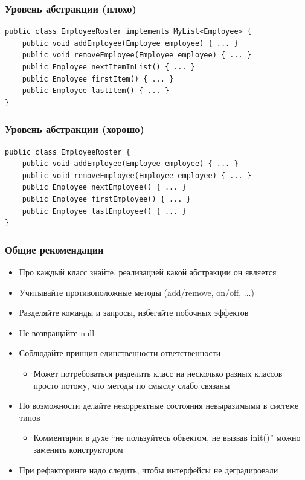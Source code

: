 \documentclass[xetex,mathserif,serif]{beamer}
\begin{document}
	\begin{frame}[fragile]
		\frametitle{Уровень абстракции (плохо)}
		\begin{verbatim}
public class EmployeeRoster implements MyList<Employee> {
    public void addEmployee(Employee employee) { ... }
    public void removeEmployee(Employee employee) { ... }
    public Employee nextItemInList() { ... }
    public Employee firstItem() { ... }
    public Employee lastItem() { ... }
}
		\end{verbatim}
	\end{frame}

	\begin{frame}[fragile]
		\frametitle{Уровень абстракции (хорошо)}
		\begin{verbatim}
public class EmployeeRoster {
    public void addEmployee(Employee employee) { ... }
    public void removeEmployee(Employee employee) { ... }
    public Employee nextEmployee() { ... }
    public Employee firstEmployee() { ... }
    public Employee lastEmployee() { ... }
}
		\end{verbatim}
	\end{frame}

	\begin{frame}
		\frametitle{Общие рекомендации}
		\begin{itemize}
			\item Про каждый класс знайте, реализацией какой абстракции он является
			\item Учитывайте противоположные методы (add/remove, on/off, ...)
			\item Разделяйте команды и запросы, избегайте побочных эффектов
			\item Не возвращайте null
			\item Соблюдайте принцип единственности ответственности
			\begin{itemize}
				\item Может потребоваться разделить класс на несколько разных классов просто потому, что методы по смыслу слабо связаны
			\end{itemize}
			\item По возможности делайте некорректные состояния невыразимыми в системе типов
			\begin{itemize}
				\item Комментарии в духе ``не пользуйтесь объектом, не вызвав  init()'' можно заменить конструктором
			\end{itemize}
			\item При рефакторинге надо следить, чтобы интерфейсы не деградировали
		\end{itemize}
	\end{frame}
\end{document}

